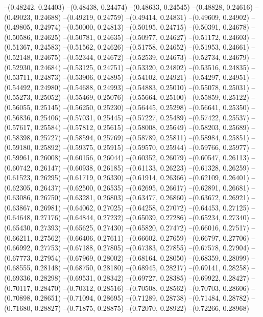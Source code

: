 --(0.48242, 0.24403)
--(0.48438, 0.24474)
--(0.48633, 0.24545)
--(0.48828, 0.24616)
--(0.49023, 0.24688)
--(0.49219, 0.24759)
--(0.49414, 0.24831)
--(0.49609, 0.24902)
--(0.49805, 0.24974)
--(0.50000, 0.24813)
--(0.50195, 0.24715)
--(0.50391, 0.24678)
--(0.50586, 0.24625)
--(0.50781, 0.24635)
--(0.50977, 0.24627)
--(0.51172, 0.24603)
--(0.51367, 0.24583)
--(0.51562, 0.24626)
--(0.51758, 0.24652)
--(0.51953, 0.24661)
--(0.52148, 0.24675)
--(0.52344, 0.24672)
--(0.52539, 0.24673)
--(0.52734, 0.24679)
--(0.52930, 0.24684)
--(0.53125, 0.24751)
--(0.53320, 0.24802)
--(0.53516, 0.24835)
--(0.53711, 0.24873)
--(0.53906, 0.24895)
--(0.54102, 0.24921)
--(0.54297, 0.24951)
--(0.54492, 0.24980)
--(0.54688, 0.24993)
--(0.54883, 0.25010)
--(0.55078, 0.25031)
--(0.55273, 0.25052)
--(0.55469, 0.25076)
--(0.55664, 0.25100)
--(0.55859, 0.25122)
--(0.56055, 0.25145)
--(0.56250, 0.25230)
--(0.56445, 0.25298)
--(0.56641, 0.25350)
--(0.56836, 0.25406)
--(0.57031, 0.25445)
--(0.57227, 0.25489)
--(0.57422, 0.25537)
--(0.57617, 0.25584)
--(0.57812, 0.25615)
--(0.58008, 0.25649)
--(0.58203, 0.25689)
--(0.58398, 0.25727)
--(0.58594, 0.25769)
--(0.58789, 0.25811)
--(0.58984, 0.25851)
--(0.59180, 0.25892)
--(0.59375, 0.25915)
--(0.59570, 0.25944)
--(0.59766, 0.25977)
--(0.59961, 0.26008)
--(0.60156, 0.26044)
--(0.60352, 0.26079)
--(0.60547, 0.26113)
--(0.60742, 0.26147)
--(0.60938, 0.26185)
--(0.61133, 0.26223)
--(0.61328, 0.26259)
--(0.61523, 0.26295)
--(0.61719, 0.26330)
--(0.61914, 0.26366)
--(0.62109, 0.26401)
--(0.62305, 0.26437)
--(0.62500, 0.26535)
--(0.62695, 0.26617)
--(0.62891, 0.26681)
--(0.63086, 0.26750)
--(0.63281, 0.26803)
--(0.63477, 0.26860)
--(0.63672, 0.26921)
--(0.63867, 0.26981)
--(0.64062, 0.27025)
--(0.64258, 0.27072)
--(0.64453, 0.27125)
--(0.64648, 0.27176)
--(0.64844, 0.27232)
--(0.65039, 0.27286)
--(0.65234, 0.27340)
--(0.65430, 0.27393)
--(0.65625, 0.27430)
--(0.65820, 0.27472)
--(0.66016, 0.27517)
--(0.66211, 0.27562)
--(0.66406, 0.27611)
--(0.66602, 0.27659)
--(0.66797, 0.27706)
--(0.66992, 0.27753)
--(0.67188, 0.27805)
--(0.67383, 0.27855)
--(0.67578, 0.27904)
--(0.67773, 0.27954)
--(0.67969, 0.28002)
--(0.68164, 0.28050)
--(0.68359, 0.28099)
--(0.68555, 0.28148)
--(0.68750, 0.28180)
--(0.68945, 0.28217)
--(0.69141, 0.28258)
--(0.69336, 0.28298)
--(0.69531, 0.28342)
--(0.69727, 0.28385)
--(0.69922, 0.28427)
--(0.70117, 0.28470)
--(0.70312, 0.28516)
--(0.70508, 0.28562)
--(0.70703, 0.28606)
--(0.70898, 0.28651)
--(0.71094, 0.28695)
--(0.71289, 0.28738)
--(0.71484, 0.28782)
--(0.71680, 0.28827)
--(0.71875, 0.28875)
--(0.72070, 0.28922)
--(0.72266, 0.28968)
